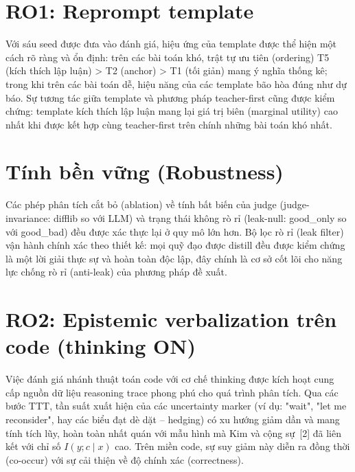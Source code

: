 \section{RO1: Reprompt template}\label{rq1-the-reprompt-template}

Với sáu seed được đưa vào đánh giá, hiệu ứng của template được thể hiện một cách rõ ràng và ổn định: trên các bài toán khó, trật tự ưu tiên (ordering) T5 (kích thích lập luận) \textgreater{} T2 (anchor) \textgreater{} T1 (tối giản) mang ý nghĩa thống kê; trong khi trên các bài toán dễ, hiệu năng của các template bão hòa đúng như dự báo. Sự tương tác giữa template và phương pháp teacher-first cũng được kiểm chứng: template kích thích lập luận mang lại giá trị biên (marginal utility) cao nhất khi được kết hợp cùng teacher-first trên chính những bài toán khó nhất.

\section{Tính bền vững (Robustness)}\label{robustness}

Các phép phân tích cắt bỏ (ablation) về tính bất biến của judge (judge-invariance: difflib so với LLM) và trạng thái không rò rỉ (leak-null: good\_only so với good\_bad) đều được xác thực lại ở quy mô lớn hơn. Bộ lọc rò rỉ (leak filter) vận hành chính xác theo thiết kế: mọi quỹ đạo được distill đều được kiểm chứng là một lời giải thực sự và hoàn toàn độc lập, đây chính là cơ sở cốt lõi cho năng lực chống rò rỉ (anti-leak) của phương pháp đề xuất.

\section{RO2: Epistemic verbalization trên code (thinking ON)}\label{rq2-epistemic-verbalization-on-code-thinking-on}

Việc đánh giá nhánh thuật toán code với cơ chế thinking được kích hoạt cung cấp nguồn dữ liệu reasoning trace phong phú cho quá trình phân tích. Qua các bước TTT, tần suất xuất hiện của các uncertainty marker (ví dụ: "wait", "let me reconsider", hay các biểu đạt dè dặt -- hedging) có xu hướng giảm dần và mang tính tích lũy, hoàn toàn nhất quán với mẫu hình mà Kim và cộng sự~{[}2{]} đã liên kết với chỉ số \(I(y;c\mid x)\) cao. Trên miền code, sự suy giảm này diễn ra đồng thời (co-occur) với sự cải thiện về độ chính xác (correctness).

